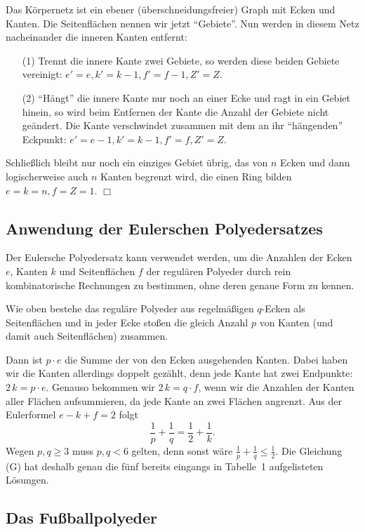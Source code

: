 \documentclass[11pt]{article}
\begin{document}
Das Körpernetz ist ein ebener (überschneidungsfreier) Graph mit Ecken
und Kanten. Die Seitenflächen nennen wir jetzt ``Gebiete''.  Nun
werden in diesem Netz nacheinander die inneren Kanten entfernt:
\begin{itemize}
\item[(1)] Trennt die innere Kante zwei Gebiete, so werden diese beiden
  Gebiete vereinigt: $e'=e, k'=k-1, f'=f-1, Z'=Z$.
\item [(2)] ``Hängt'' die innere Kante nur noch an einer Ecke und ragt
  in ein Gebiet hinein, so wird beim Entfernen der Kante die Anzahl
  der Gebiete nicht geändert. Die Kante verschwindet zusammen mit dem
  an ihr ``hängenden'' Eckpunkt: $e'=e-1,k'=k-1,f'=f, Z'=Z$.
\end{itemize}
Schließlich bleibt nur noch ein einziges Gebiet übrig, das von $n$
Ecken und dann logischerweise auch $n$ Kanten begrenzt wird, die einen
Ring bilden $e=k=n, f=Z=1$. $\Box$\medskip

\subsection*{Anwendung der Eulerschen Polyedersatzes}

Der Eulersche Polyedersatz kann verwendet werden, um die Anzahlen der Ecken
$e$, Kanten $k$ und Seitenflächen $f$ der regulären Polyeder durch rein
kombinatorische Rechnungen zu bestimmen, ohne deren genaue Form zu kennen.

Wie oben bestehe das reguläre Polyeder aus regelmäßigen $q$-Ecken als
Seitenflächen und in jeder Ecke stoßen die gleich Anzahl $p$ von Kanten (und
damit auch Seitenflächen) zusammen.

Dann ist $p\cdot e$ die Summe der von den Ecken ausgehenden Kanten. Dabei
haben wir die Kanten allerdings doppelt gezählt, denn jede Kante hat zwei
Endpunkte: $2\,k = p\cdot e$. Genauso bekommen wir $2\,k = q\cdot f$, wenn wir
die Anzahlen der Kanten aller Flächen aufsummieren, da jede Kante an zwei
Flächen angrenzt. Aus der Eulerformel $e-k+f=2$ folgt 
\[\frac{1}{p} + \frac{1}{q} =  \frac12 +\frac{1}{k}. \tag{G}\]
Wegen $p,q\ge 3$ muss $p,q<6$ gelten, denn sonst wäre $\frac{1}{p} +
\frac{1}{q} \le \frac12$.  Die Gleichung (G) hat deshalb genau die fünf
bereits eingangs in Tabelle~1 aufgelisteten Lösungen.

\subsection*{Das Fußballpolyeder}
\end{document}

